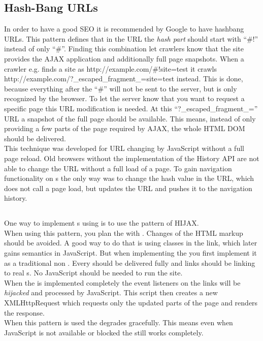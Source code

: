 \subsection{Hash-Bang URLs}
In order to have a good SEO it is recommended by Google to have hashbang URLs.
This pattern defines that in the URL the \emph{hash part} should start with \enquote{\#!} instead of only \enquote{\#}.
Finding this combination let crawlers know that the site provides the AJAX application and additionally full page snapshots.
When a crawler e.g. finds a site as http://example.com/\#!site=test it crawls \newline http://example.com/?\_escaped\_fragment\_=site=test instead.
This is done, because everything after the \enquote{\#} will not be sent to the server, but is only recognized by the browser.
To let the server know that you want to request a specific page this URL modification is needed.
At this \enquote{?\_escaped\_fragment\_=} URL a snapshot of the full page should be available.
This means, instead of only providing a few parts of the page required by AJAX, the whole HTML DOM should be delivered.
\\
This technique was developed for URL changing by JavaScript without a full page reload.
Old browsers without the implementation of the History API are not able to change the URL without a full load of a page.
To gain navigation functionality on \singlePageApplication{}s the only way was to change the hash value in the URL, which does not call a page load, but updates the URL and pushes it to the navigation history.

\subsection{\hijax{}}
One way to implement \singlePageApplication{}s using \ajax{} is to use the pattern of HIJAX.
\\
When using this pattern, you plan the \webSite{} with \ajax{}.
Changes of the HTML markup should be avoided.
A good way to do that is using classes in the link, which later gains semantics in JavaScript.
But when implementing the \webSite{} you first implement it as a traditional non \ajax{} \webSite{}.
Every \webPage{} should be delivered fully and links should be linking to real \webPage{}s.
No JavaScript should be needed to run the site.
\\
When the \webSite{} is implemented completely the event listeners on the links will be \emph{hijacked} and processed by JavaScript.
This script then creates a new XMLHttpRequest which requests only the updated parts of the page and renders the response.
\\
When this pattern is used the \webSite{} degrades gracefully.
This means even when JavaScript is not available or blocked the \webSite{} still works completely.

